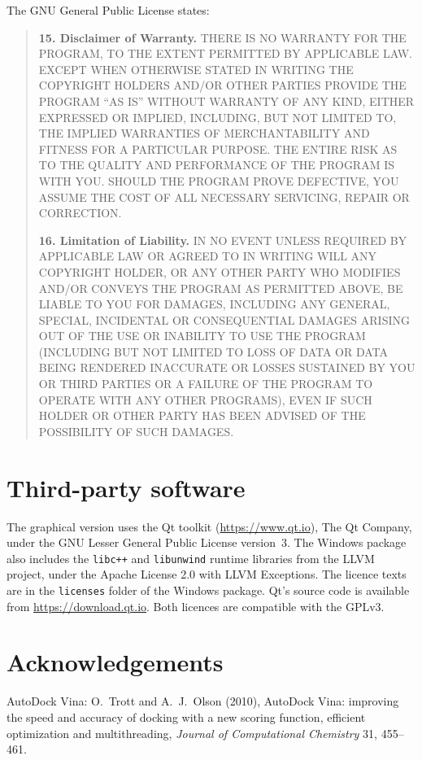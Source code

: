 \documentclass[11pt,a4paper,oneside]{report}
\newcommand{\cmd}[1]{\texttt{#1}}            %
\begin{document}
The GNU General Public License states:

\begin{quote}\small
\textbf{15. Disclaimer of Warranty.} THERE IS NO WARRANTY FOR THE PROGRAM, TO THE EXTENT PERMITTED
BY APPLICABLE LAW. EXCEPT WHEN OTHERWISE STATED IN WRITING THE COPYRIGHT HOLDERS AND/OR OTHER
PARTIES PROVIDE THE PROGRAM ``AS IS'' WITHOUT WARRANTY OF ANY KIND, EITHER EXPRESSED OR IMPLIED,
INCLUDING, BUT NOT LIMITED TO, THE IMPLIED WARRANTIES OF MERCHANTABILITY AND FITNESS FOR A
PARTICULAR PURPOSE. THE ENTIRE RISK AS TO THE QUALITY AND PERFORMANCE OF THE PROGRAM IS WITH YOU.
SHOULD THE PROGRAM PROVE DEFECTIVE, YOU ASSUME THE COST OF ALL NECESSARY SERVICING, REPAIR OR
CORRECTION.

\textbf{16. Limitation of Liability.} IN NO EVENT UNLESS REQUIRED BY APPLICABLE LAW OR AGREED TO IN
WRITING WILL ANY COPYRIGHT HOLDER, OR ANY OTHER PARTY WHO MODIFIES AND/OR CONVEYS THE PROGRAM AS
PERMITTED ABOVE, BE LIABLE TO YOU FOR DAMAGES, INCLUDING ANY GENERAL, SPECIAL, INCIDENTAL OR
CONSEQUENTIAL DAMAGES ARISING OUT OF THE USE OR INABILITY TO USE THE PROGRAM (INCLUDING BUT NOT
LIMITED TO LOSS OF DATA OR DATA BEING RENDERED INACCURATE OR LOSSES SUSTAINED BY YOU OR THIRD
PARTIES OR A FAILURE OF THE PROGRAM TO OPERATE WITH ANY OTHER PROGRAMS), EVEN IF SUCH HOLDER OR
OTHER PARTY HAS BEEN ADVISED OF THE POSSIBILITY OF SUCH DAMAGES.
\end{quote}

\section{Third-party software}

The graphical version uses the Qt toolkit (\url{https://www.qt.io}), \textcopyright{} The Qt Company,
under the GNU Lesser General Public License version~3. The Windows package also includes the
\cmd{libc++} and \cmd{libunwind} runtime libraries from the LLVM project, under the Apache License
2.0 with LLVM Exceptions. The licence texts are in the \cmd{licenses} folder of the Windows
package. Qt's source code is available from \url{https://download.qt.io}. Both licences are
compatible with the GPLv3.

\section{Acknowledgements}

AutoDock Vina: O.~Trott and A.~J.~Olson (2010), AutoDock Vina: improving the speed and accuracy of
docking with a new scoring function, efficient optimization and multithreading,
\emph{Journal of Computational Chemistry} 31, 455--461.
\end{document}
